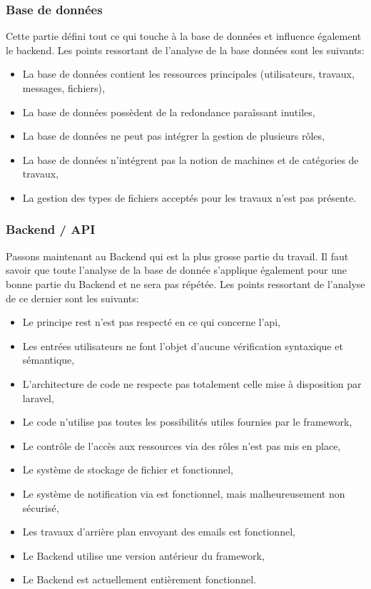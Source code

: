 \documentclass[
    iai, %
    il, %
]{heig-tb}
\begin{document}
\subsubsection{Base de données}
Cette partie défini tout ce qui touche à la base de données et influence également le \Gls{backend}.\newline
Les points ressortant de l'analyse de la base données sont les suivants:
\begin{itemize}
    \item La base de données contient les ressources principales (utilisateurs, travaux, messages, fichiers),
    \item La base de données possèdent de la redondance paraîssant inutiles,
    \item La base de données ne peut pas intégrer la gestion de plusieurs rôles,
    \item La base de données n'intégrent pas la notion de machines et de catégories de travaux,
    \item La gestion des types de fichiers acceptés pour les travaux n'est pas présente.
\end{itemize}

\subsubsection{Backend / API}
Passons maintenant au Backend qui est la plus grosse partie du travail.\newline
Il faut savoir que toute l'analyse de la base de donnée s'applique également pour une bonne partie du Backend et ne sera pas répétée.\newline
Les points ressortant de l'analyse de ce dernier sont les suivants:
\begin{itemize}
    \item Le principe \Gls{rest} n'est pas respecté en ce qui concerne l'\Gls{api},
    \item Les entrées utilisateurs ne font l'objet d'aucune vérification syntaxique et sémantique,
    \item L'architecture de code ne respecte pas totalement celle mise à disposition par \Gls{laravel},
    \item Le code n'utilise pas toutes les possibilités utiles fournies par le \Gls{framework},
    \item Le contrôle de l'accès aux ressources via des rôles n'est pas mis en place,
    \item Le système de stockage de fichier et fonctionnel,
    \item Le système de notification via est fonctionnel, mais malheureusement non sécurisé,
    \item Les travaux d'arrière plan envoyant des emails est fonctionnel,
    \item Le Backend utilise une version antérieur du framework,
    \item Le Backend est actuellement entièrement fonctionnel.
\end{itemize}
\end{document}
